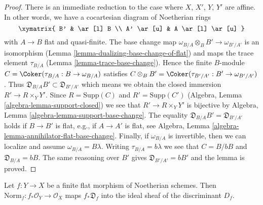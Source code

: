 \begin{proof}
There is an immediate reduction to the case where $X$, $X'$, $Y$, $Y'$
are affine. In other words, we have a cocartesian diagram of Noetherian
rings
$$
\xymatrix{
B' & \ar[l] B \\
A' \ar[u] & A \ar[l] \ar[u]
}
$$
with $A \to B$ flat and quasi-finite. The base change map
$\omega_{B/A} \otimes_B B' \to \omega_{B'/A'}$ is an isomorphism
(Lemma \ref{lemma-dualizing-base-change-of-flat}) and maps
the trace element $\tau_{B/A}$ (Lemma \ref{lemma-trace-base-change}).
Hence the finite $B$-module $C = \Coker(\tau_{B/A} : B \to \omega_{B/A})$
satisfies $C \otimes_B B' = \Coker(\tau_{B'/A'} : B' \to \omega_{B'/A'})$.
Thus $\mathfrak{D}_{B/A}B' \subset \mathfrak{D}_{B'/A'}$ which means
we obtain the closed immersion $R' \to R \times_Y Y'$.
Since $R = \text{Supp}(C)$ and $R' = \text{Supp}(C')$
(Algebra, Lemma \ref{algebra-lemma-support-closed})
we see that $R' \to R \times_Y Y'$ is bijective by
Algebra, Lemma \ref{algebra-lemma-support-base-change}.
The equality $\mathfrak{D}_{B/A}B' = \mathfrak{D}_{B'/A'}$ holds
if $B \to B'$ is flat, e.g., if $A \to A'$ is flat, see
Algebra, Lemma \ref{algebra-lemma-annihilator-flat-base-change}.
Finally, if $\omega_{B/A}$ is invertible, then we can localize
and assume $\omega_{B/A} = B \lambda$. Writing $\tau_{B/A} = b\lambda$
we see that $C = B/bB$ and $\mathfrak{D}_{B/A} = bB$.
The same reasoning over $B'$
gives $\mathfrak{D}_{B'/A'} = bB'$ and the lemma is proved.
\end{proof}

\begin{lemma}
\label{lemma-norm-different-in-discriminant}
Let $f : Y \to X$ be a finite flat morphism of Noetherian schemes.
Then $\text{Norm}_f : f_*\mathcal{O}_Y \to \mathcal{O}_X$ maps
$f_*\mathfrak{D}_f$ into the ideal sheaf of the discriminant $D_f$.
\end{lemma}


